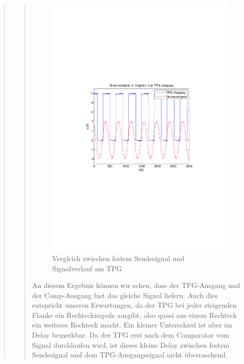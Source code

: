 \begin{quote}
\begin{quote}
             \begin{figure}[H] \centering
                    \includegraphics[scale=0.5, trim = 2cm 6.5cm 1.5cm 8.5cm,
                    clip]{./Bilder/sin_vs_tpg}
                        \caption{Vergleich zwischen festem Sendesignal und
                        Signalverlauf am TPG}
                \end{figure}
           
           An diesem Ergebnis können wir sehen, dass der TPG-Ausgang und der
           Comp-Ausgang fast das gleiche Signal liefern. Auch dies entspricht
           unseren Erwartungen, da der TPG bei jeder steigenden Flanke ein
           Rechteckimpuls ausgibt, also quasi aus einem Rechteck ein weiteres
           Rechteck macht. Ein kleiner Unterschied ist aber im Delay bemerkbar.
           Da der TPG erst nach dem Comparator vom Signal durchlaufen wird, ist
           dieses kleine Delay zwischen festem Sendesignal und dem
           TPG-Ausgangssignal nicht überraschend.\\
           

\end{quote}
\end{quote}
